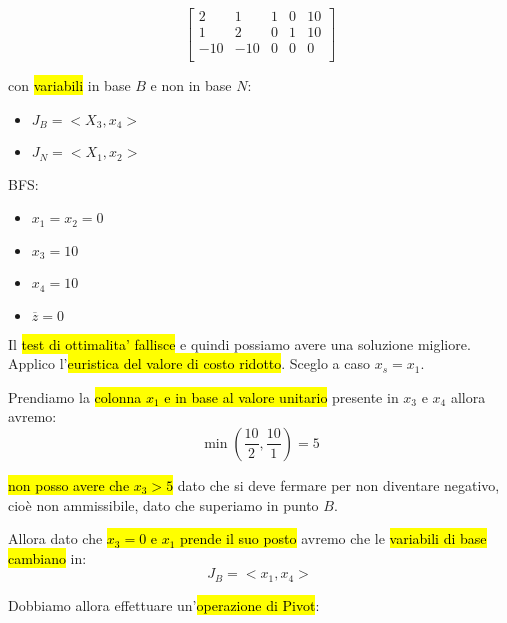 $$
\left[ {\begin{array}{ccccc}
	2 & 1 & 1 & 0 & 10\\
	1 & 2 & 0 & 1 & 10\\
	-10 & -10 & 0 & 0 & 0\\
\end{array} } \right]
$$

con \hl{variabili} in base $B$ e non in base $N$:

\begin{itemize}
	\item $J_B = <X_3, x_4>$
	\item $J_N = <X_1, x_2>$
\end{itemize}

BFS:

\begin{itemize}
	\item $x_1 = x_2 = 0$
	\item $x_3 = 10$
	\item $x_4 = 10$
	\item $\overline{z} = 0$
\end{itemize}

Il \hl{test di ottimalita' fallisce} e quindi possiamo avere una soluzione migliore. Applico l'\hl{euristica del valore di costo ridotto}. Sceglo a caso $x_s = x_1$.

Prendiamo la \hl{colonna $x_1$ e in base al valore unitario} presente in $x_3$ e $x_4$ allora avremo:
$$\min (\frac{10}{2}, \frac{10}{1}) = 5$$

\hl{non posso avere che $x_3 > 5$} dato che si deve fermare per non diventare negativo, cioè non ammissibile, dato che superiamo in punto $B$.

Allora dato che \hl{$x_3 = 0$ e $x_1$ prende il suo posto} avremo che le \hl{variabili di base cambiano} in:
$$J_B = <x_1, x_4>$$

Dobbiamo allora effettuare un'\hl{operazione di Pivot}:

